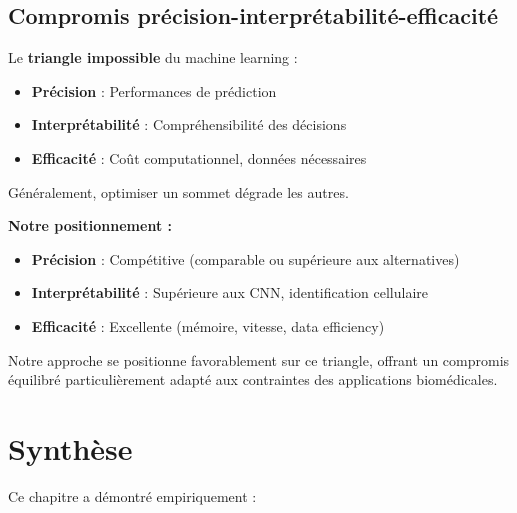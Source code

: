 \subsection{Compromis précision-interprétabilité-efficacité}

Le \textbf{triangle impossible} du machine learning :
\begin{itemize}
    \item \textbf{Précision} : Performances de prédiction
    \item \textbf{Interprétabilité} : Compréhensibilité des décisions
    \item \textbf{Efficacité} : Coût computationnel, données nécessaires
\end{itemize}

Généralement, optimiser un sommet dégrade les autres.

\textbf{Notre positionnement :}
\begin{itemize}
    \item \textbf{Précision} : Compétitive (comparable ou supérieure aux alternatives)
    \item \textbf{Interprétabilité} : Supérieure aux CNN, identification cellulaire
    \item \textbf{Efficacité} : Excellente (mémoire, vitesse, data efficiency)
\end{itemize}

Notre approche se positionne favorablement sur ce triangle, offrant un compromis équilibré particulièrement adapté aux contraintes des applications biomédicales.

\section{Synthèse}

Ce chapitre a démontré empiriquement :

